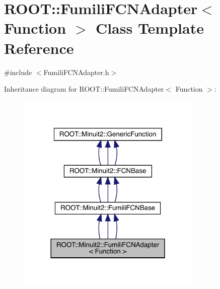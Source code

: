 \hypertarget{classROOT_1_1Minuit2_1_1FumiliFCNAdapter}{}\section{R\+O\+OT\+:\+:Fumili\+F\+C\+N\+Adapter$<$ Function $>$ Class Template Reference}
\label{classROOT_1_1Minuit2_1_1FumiliFCNAdapter}


{\ttfamily \#include $<$Fumili\+F\+C\+N\+Adapter.\+h$>$}



Inheritance diagram for R\+O\+OT\+:\+:Fumili\+F\+C\+N\+Adapter$<$ Function $>$\+:
\nopagebreak
\begin{figure}[H]
\begin{center}
\leavevmode
\includegraphics[width=249pt]{de/d6d/classROOT_1_1Minuit2_1_1FumiliFCNAdapter__inherit__graph}
\end{center}
\end{figure}



